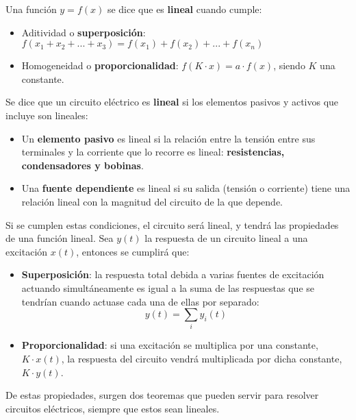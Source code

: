 \documentclass[11pt]{book} %
\numberwithin{dummy}{section}
\theoremstyle{ocrenumbox}
\theoremstyle{blacknumex}
\theoremstyle{blacknumbox}
\theoremstyle{ocrenum}
\newlength\esp
\begin{document}
	Una función $y=f(x)$ se dice que es \textbf{lineal} cuando cumple: 
	\begin{itemize}
	    \item Aditividad o \textbf{superposición}: $f(x_1+x_2+...+x_3)=f(x_1)+f(x_2)+...+f(x_n)$
	    \item Homogeneidad o \textbf{proporcionalidad}: $f(K\cdot x)=a\cdot f(x)$, siendo $K$ una constante.
	\end{itemize}
	Se dice que un circuito eléctrico es \textbf{lineal} si los elementos pasivos y activos que incluye son lineales:
	\begin{itemize}
	    \item Un \textbf{elemento pasivo} es lineal si la relación entre la tensión entre sus terminales y la corriente que lo recorre es lineal: \textbf{resistencias, condensadores y bobinas}.
        \item Una \textbf{fuente dependiente} es lineal si su salida (tensión o corriente) tiene una relación lineal con la magnitud del circuito de la que depende.
	\end{itemize}
    Si se cumplen estas condiciones, el circuito será lineal, y tendrá las propiedades de una función lineal. Sea $y(t)$ la respuesta de un circuito lineal a una excitación $x(t)$, entonces se cumplirá que:
    \begin{itemize}
    \item \textbf{Superposición}: la respuesta total debida a varias fuentes de excitación actuando simultáneamente es igual a la suma de las respuestas que se tendrían cuando actuase cada una de ellas por separado:
    \begin{equation*}
        y(t) = \sum_i y_i(t)
    \end{equation*}
    \item \textbf{Proporcionalidad}: si una excitación se multiplica por una constante, $K\cdot x(t)$, la respuesta del circuito vendrá multiplicada por dicha constante, $K\cdot y(t)$. 
    \end{itemize}
    
    De estas propiedades, surgen dos teoremas que pueden servir para resolver circuitos eléctricos, siempre que estos sean lineales.
    
\end{document}
